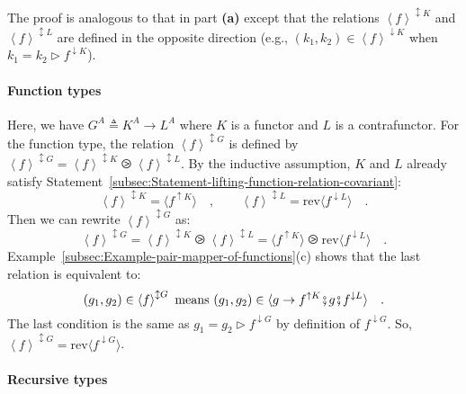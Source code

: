 The proof is analogous to that in part \textbf{(a)} except that the
relations $\left<f\right>^{\updownarrow K}$ and $\left<f\right>^{\updownarrow L}$
are defined in the opposite direction (e.g., $(k_{1},k_{2})\in\left<f\right>^{\downarrow K}$
when $k_{1}=k_{2}\triangleright f^{\downarrow K}$).

\paragraph{Function types}

Here, we have $G^{A}\triangleq K^{A}\rightarrow L^{A}$ where $K$
is a functor and $L$ is a contrafunctor. For the function type, the
relation $\left<f\right>^{\updownarrow G}$ is defined by $\left<f\right>^{\updownarrow G}=\left<f\right>^{\updownarrow K}\ogreaterthan\left<f\right>^{\updownarrow L}$.
By the inductive assumption, $K$ and $L$ already satisfy Statement~\ref{subsec:Statement-lifting-function-relation-covariant}:
\[
\left<f\right>^{\updownarrow K}=\langle f^{\uparrow K}\rangle\quad,\quad\quad\left<f\right>^{\updownarrow L}=\text{rev}\langle f^{\downarrow L}\rangle\quad.
\]
Then we can rewrite $\left<f\right>^{\updownarrow G}$ as:
\[
\left<f\right>^{\updownarrow G}=\left<f\right>^{\updownarrow K}\ogreaterthan\left<f\right>^{\updownarrow L}=\langle f^{\uparrow K}\rangle\ogreaterthan\text{rev}\langle f^{\downarrow L}\rangle\quad.
\]
Example~\ref{subsec:Example-pair-mapper-of-functions}(c) shows that
the last relation is equivalent to:
\[
(g_{1},g_{2})\in\left<f\right>^{\updownarrow G}\text{ means }(g_{1},g_{2})\in\langle g\rightarrow f^{\uparrow K}\bef g\bef f^{\downarrow L}\rangle\quad.
\]
 The last condition is the same as $g_{1}=g_{2}\triangleright f^{\downarrow G}$
by definition of $f^{\downarrow G}$. So, $\left<f\right>^{\updownarrow G}=\text{rev}\langle f^{\downarrow G}\rangle$.

\paragraph{Recursive types}

